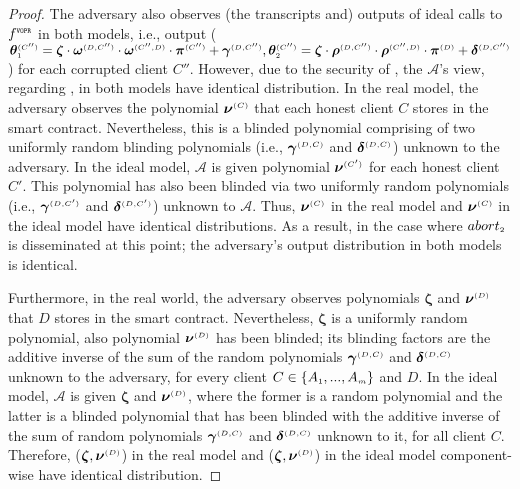 \begin{proof}
The adversary also observes (the transcripts and) outputs of ideal calls to $f^{\scriptscriptstyle \mathtt{VOPR}}$ in both models, i.e., output ($\bm\theta^{ \scriptscriptstyle {  {(C'')}}}_{\scriptscriptstyle 1}=\bm\zeta \cdot \bm\omega^{ \scriptscriptstyle {  {(D, C'')}}}\cdot \bm\omega^{ \scriptscriptstyle {  {(C'', D)}}}\cdot \bm\pi^{ \scriptscriptstyle {  {(C'')}}}+\bm\gamma^{ \scriptscriptstyle {  {(D,C'')}}}, \bm\theta^{ \scriptscriptstyle {  {(C'')}}}_{\scriptscriptstyle 2}=\bm\zeta \cdot \bm\rho^{ \scriptscriptstyle {  {(D, C'')}}}\cdot \bm\rho^{ \scriptscriptstyle {  {(C'',D)}}}\cdot \bm\pi^{ \scriptscriptstyle {  {(D)}}}+\bm\delta^{ \scriptscriptstyle {  {(D, C'')}}}$) for each corrupted client $C''$. However, due to the security of \vopr, the $\mathcal{A}$'s view, regarding \vopr, in both models have identical distribution.  
%
In the real model, the adversary observes the polynomial ${\bm\nu}^{ \scriptscriptstyle {  {(C)}}}$ that each honest client $C$ stores in the smart contract. Nevertheless, this is a blinded polynomial comprising of two uniformly random blinding polynomials (i.e., $\bm\gamma^{ \scriptscriptstyle {  {(D,C)}}}$ and $\bm\delta^{ \scriptscriptstyle {  {(D,C)}}}$) unknown to the adversary. In the ideal model, $\mathcal{A}$ is given polynomial  $ {\bm\nu}^{ \scriptscriptstyle {  {(C')}}}$ for each honest client $C'$. This polynomial has also been blinded via two uniformly random polynomials (i.e., $ {\bm\gamma}^{ \scriptscriptstyle {  {(D, C')}}}$ and $ {\bm\delta}^{ \scriptscriptstyle {  {(D, C')}}}$) unknown to $\mathcal{A}$. Thus, ${\bm\nu}^{ \scriptscriptstyle {  {(C)}}}$ in the real model and $ {\bm\nu}^{ \scriptscriptstyle {  {(C)}}}$ in the ideal model have identical distributions. As a result, in the case where $abort_{\scriptscriptstyle 2}$ is disseminated at this point; the adversary's output distribution in both models is identical. 



Furthermore, in the real world, the adversary observes polynomials ${\bm\zeta}$ and  $\bm\nu^{ \scriptscriptstyle {  {(D)}}}$  that  $D$ stores in the smart contract. Nevertheless, ${\bm\zeta}$ is a uniformly random polynomial, also polynomial $\bm\nu^{ \scriptscriptstyle {  {(D)}}}$ has been blinded; its blinding factors are the additive inverse of  the sum of the random polynomials $\bm\gamma^{ \scriptscriptstyle {  {(D,C)}}}$ and $\bm\delta^{ \scriptscriptstyle {  {(D,C)}}}$ unknown to the adversary, for every client $C\in \{  {  A}_{ \scriptscriptstyle {   1}}, ...,   {  A}_{ \scriptscriptstyle {   m}}\}$ and  $D$. In the ideal model, $\mathcal{A}$ is given $ {\bm\zeta}$ and $ {\bm\nu}^{ \scriptscriptstyle {  {(D)}}}$, where the former is a random polynomial and the latter is a blinded polynomial that has been blinded with the additive inverse of the sum of random polynomials $ {\bm\gamma}^{ \scriptscriptstyle {  {(D,C)}}}$ and $ {\bm\delta}^{ \scriptscriptstyle {  {(D,C)}}}$ unknown to it,  for all client $C$. Therefore,  (${\bm\zeta}, \bm\nu^{ \scriptscriptstyle {  {(D)}}}$)  in the real model and  ($ {\bm\zeta},  {\bm\nu}^{ \scriptscriptstyle {  {(D)}}}$) in the ideal model component-wise have identical distribution. 




\end{proof}
